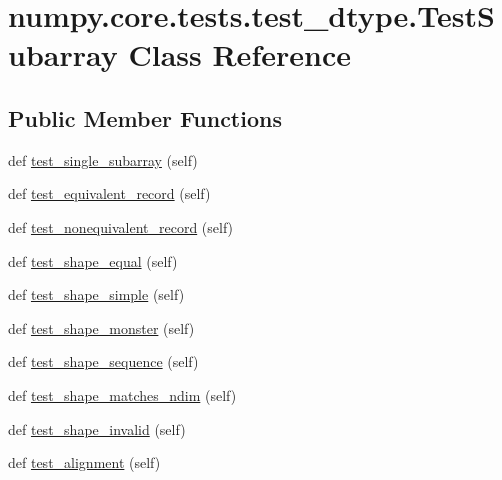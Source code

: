 \hypertarget{classnumpy_1_1core_1_1tests_1_1test__dtype_1_1TestSubarray}{}\section{numpy.\+core.\+tests.\+test\+\_\+dtype.\+Test\+Subarray Class Reference}
\label{classnumpy_1_1core_1_1tests_1_1test__dtype_1_1TestSubarray}
\subsection*{Public Member Functions}
\begin{DoxyCompactItemize}
\item 
def \hyperlink{classnumpy_1_1core_1_1tests_1_1test__dtype_1_1TestSubarray_a7e9202002789da14f89f4a0a60e7b5b3}{test\+\_\+single\+\_\+subarray} (self)
\item 
def \hyperlink{classnumpy_1_1core_1_1tests_1_1test__dtype_1_1TestSubarray_a20672fcde7257ab3ff1e795a226c5ca5}{test\+\_\+equivalent\+\_\+record} (self)
\item 
def \hyperlink{classnumpy_1_1core_1_1tests_1_1test__dtype_1_1TestSubarray_aa21d6c88b011fefd31607bc93c83481f}{test\+\_\+nonequivalent\+\_\+record} (self)
\item 
def \hyperlink{classnumpy_1_1core_1_1tests_1_1test__dtype_1_1TestSubarray_af985d2619b3c6c242ee0fcf404b171fa}{test\+\_\+shape\+\_\+equal} (self)
\item 
def \hyperlink{classnumpy_1_1core_1_1tests_1_1test__dtype_1_1TestSubarray_a5f85e308ac38f00e9f552abc30c790a5}{test\+\_\+shape\+\_\+simple} (self)
\item 
def \hyperlink{classnumpy_1_1core_1_1tests_1_1test__dtype_1_1TestSubarray_a37312c3f616327fb5ccf6440f0534b9b}{test\+\_\+shape\+\_\+monster} (self)
\item 
def \hyperlink{classnumpy_1_1core_1_1tests_1_1test__dtype_1_1TestSubarray_ac4075beff0b6a04b42b34bc77caf8b6f}{test\+\_\+shape\+\_\+sequence} (self)
\item 
def \hyperlink{classnumpy_1_1core_1_1tests_1_1test__dtype_1_1TestSubarray_ade8551b87881881876564593b4041c73}{test\+\_\+shape\+\_\+matches\+\_\+ndim} (self)
\item 
def \hyperlink{classnumpy_1_1core_1_1tests_1_1test__dtype_1_1TestSubarray_ad1db218348c00503a6da5ba91c343149}{test\+\_\+shape\+\_\+invalid} (self)
\item 
def \hyperlink{classnumpy_1_1core_1_1tests_1_1test__dtype_1_1TestSubarray_a753e6ec2683fcf324a77f902688f8054}{test\+\_\+alignment} (self)
\end{DoxyCompactItemize}



